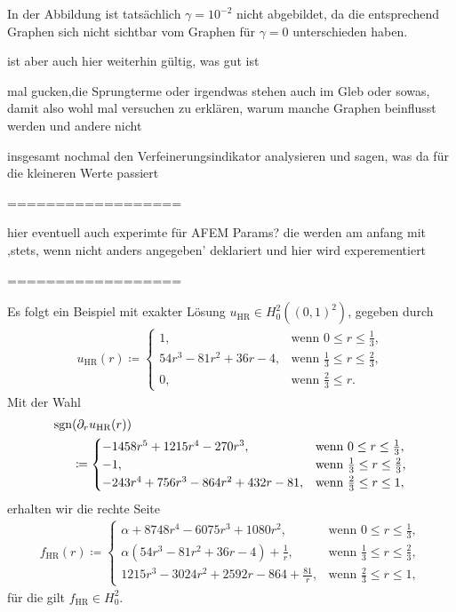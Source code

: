 In der Abbildung ist tatsächlich $\gamma= 10^{-2}$ nicht abgebildet, da
die entsprechend Graphen sich nicht sichtbar vom Graphen für $\gamma=0$
unterschieden haben.

 ist aber auch hier weiterhin gültig, was gut 
ist

mal gucken,die Sprungterme oder irgendwas stehen auch im Gleb oder sowas, 
damit also wohl mal versuchen zu erklären, warum manche Graphen beinflusst
werden und andere nicht

insgesamt nochmal den Verfeinerungsindikator analysieren und sagen,
was da für die kleineren Werte passiert

==================

hier eventuell auch experimte für AFEM Params? die werden am anfang mit
,stets, wenn nicht anders angegeben' deklariert und hier wird experementiert

==================

  Es folgt ein Beispiel mit exakter Lösung $u_\textrm{HR} \in
  H^2_0((0,1)^2)$, gegeben durch 
\begin{align*}
  u_\textrm{HR}(r)\coloneqq 
  \begin{cases}
    1, & \text{wenn } 0\leq r\leq\frac{1}{3},\\
    54r^3 - 81r^2 + 36r - 4, & 
    \text{wenn } \frac{1}{3}\leq r\leq \frac{2}{3},\\
    0, & \text{wenn } \frac{2}{3}\leq r.
  \end{cases}
\end{align*}
Mit der Wahl
\begin{align*}
  \operatorname{sgn}&(\partial_r u_\textrm{HR}(r)) \\
  &\coloneqq 
  \begin{cases}
    -1458r^5 + 1215r^4 - 270r^3, & \text{wenn } 0\leq r\leq\frac{1}{3},\\
    -1, & \text{wenn } \frac{1}{3}\leq r\leq \frac{2}{3},\\
    -243r^4 + 756r^3 - 864r^2 + 432r - 81, 
    & \text{wenn } \frac{2}{3}\leq r\leq 1,
  \end{cases}
\end{align*}
erhalten wir die rechte Seite
\begin{align*}
  f_\textrm{HR}(r)\coloneqq 
  \begin{cases}
    \alpha + 8748r^4 - 6075r^3 + 1080r^2, &
    \text{wenn } 0\leq r\leq\frac{1}{3},\\
    \alpha\left(54r^3 - 81r^2 + 36r - 4\right) + \frac{1}{r}, & 
    \text{wenn } \frac{1}{3}\leq r\leq \frac{2}{3},\\
    1215r^3 - 3024r^2 + 2592r - 864 + \frac{81}{r}, & 
    \text{wenn } \frac{2}{3}\leq r\leq 1,
  \end{cases}
\end{align*}
für die gilt $f_\textrm{HR}\in H^2_0$.



